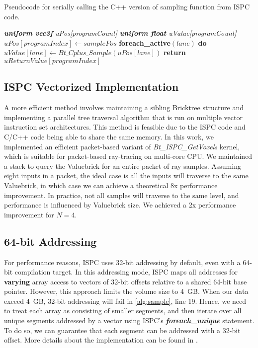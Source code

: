 \begin{algorithm}
	\caption{Pseudocode for serially calling the C++ version of sampling function from ISPC code. }\label{alg:ispc_sample}
	\begin{algorithmic}[1]
        	\State \textit{\textbf{uniform vec3f} uPos[programCount]}
            \State \textit{\textbf{uniform float} uValue[programCount]}
            \State $uPos[programIndex] \gets samplePos$
            \State \textbf{foreach\_active}$(lane)$ \textbf{do}
            	\State \ \ \ \ $uValue[lane] \gets Bt\_Cplus\_Sample(uPos[lane])$
            \State \textbf{return} $uReturnValue[programIndex]$           
    	\EndProcedure
	\end{algorithmic}
\end{algorithm}


\subsection{ISPC Vectorized Implementation}
A more efficient method involves maintaining a sibling Bricktree structure and 
implementing a parallel tree traversal algorithm that is run on multiple vector
instruction set architectures.
This method is feasible due to the ISPC code and C/C++ code being able to share the same memory.
In this work, we implemented an efficient packet-based variant of 
\textit{Bt\_ISPC\_GetVoxels} kernel, which is suitable for packet-based ray-tracing
on multi-core CPU. We maintained a stack to query the Valuebrick for an entire
packet of ray samples. Assuming eight inputs in a packet, the ideal case is all the inputs will
traverse to the same Valuebrick, in which case we can achieve a theoretical 8x performance
improvement. In practice, not all samples will traverse to the same level,
and performance is influenced by Valuebrick size. We achieved a 2x performance
improvement for $N=4$.


\subsection{64-bit Addressing} 
For performance reasons, ISPC uses 32-bit addressing by default, even with
a 64-bit compilation target. In this addressing mode, ISPC maps all addresses for
\textbf{varying} array access to vectors of 32-bit offsets relative to a shared
64-bit base pointer. However, this approach limits the volume size to 4~GB.
When our data exceed 4~GB, 32-bit addressing will fail in \cref{alg:sample},
line 19. Hence, we need to treat each array as consisting of smaller
segments, and then iterate over all unique segments addressed by a vector using
ISPC's \textbf{\textit{foreach\_unique}} statement. To do so, we can guarantee 
that each segment can be addressed with a 32-bit offset. More details about
the implementation can be found in \cite{wald_2018}. 

